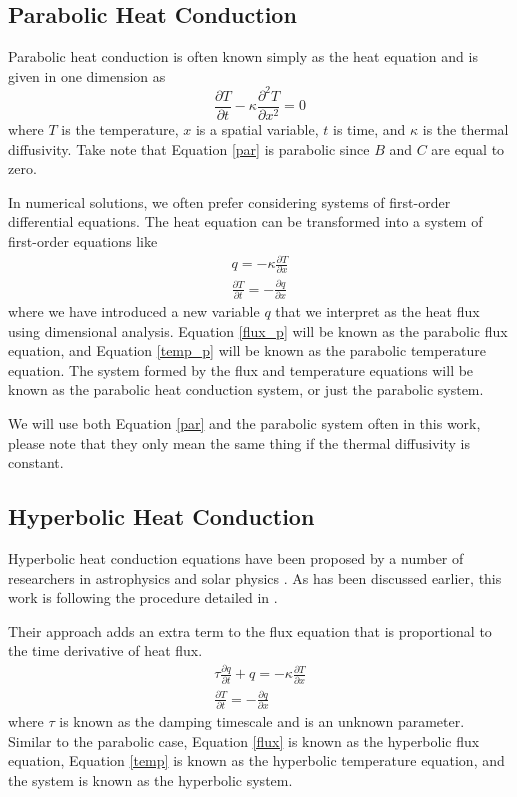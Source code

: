 \documentclass[iop]{emulateapj}
\begin{document}
				
				
		\subsection{Parabolic Heat Conduction}
		
			Parabolic heat conduction is often known simply as the heat equation and is given in one dimension as
			\begin{equation} \label{par}
				\frac{\partial T}{\partial t} - \kappa \frac{\partial^2 T}{\partial x^2} = 0
			\end{equation}
			where $T$ is the temperature, $x$ is a spatial variable, $t$ is time, and $\kappa$ is the thermal diffusivity.
			Take note that Equation \ref{par} is parabolic since $B$ and $C$ are equal to zero.
			
			In numerical solutions, we often prefer considering systems of first-order differential equations.
			The heat equation can be transformed into a system of first-order equations like
			\begin{gather}
				q = -\kappa \frac{\partial T}{\partial x} \label{flux_p} \\
				\frac{\partial T}{\partial t} = -\frac{\partial q}{\partial x} \label{temp_p} 
			\end{gather}
			where we have introduced a new variable $q$ that we interpret as the heat flux using dimensional analysis.
			Equation \ref{flux_p} will be known as the parabolic flux equation, and Equation \ref{temp_p} will be known as the parabolic temperature equation.
			The system formed by the flux and temperature equations will be known as the parabolic heat conduction system, or just the parabolic system.
			
			We will use both Equation \ref{par} and the parabolic system often in this work, please note that they only mean the same thing if the thermal diffusivity is constant.
		
		\subsection{Hyperbolic Heat Conduction}
		
			Hyperbolic heat conduction equations have been proposed by a number of researchers in astrophysics \citep{snodin_06} and solar physics \citep{A}.
				As has been discussed earlier, this work is following the procedure detailed in \cite{A}.
			
				Their approach adds an extra term to the flux equation that is proportional to the time derivative of heat flux.
				\begin{gather}
					\tau \frac{\partial q}{\partial t} + q = -\kappa \frac{\partial T}{\partial x} \label{flux}\\
					\frac{\partial T}{\partial t} = -\frac{\partial q}{\partial x} \label{temp}
				\end{gather}
				where $\tau$ is known as the damping timescale and is an unknown parameter. 
				Similar to the parabolic case, Equation \ref{flux} is known as the hyperbolic flux equation, Equation \ref{temp} is known as the hyperbolic temperature equation, and the system is known as the hyperbolic system.
				
\end{document}
